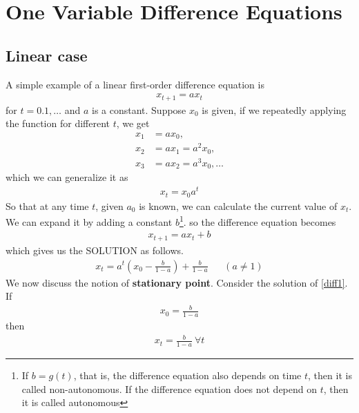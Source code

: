 \documentclass[11pt,a4paper]{book}
\theoremstyle{definition}\newtheorem{definition}{Definition}
\theoremstyle{definition}\newtheorem{fact}{Fact}
\theoremstyle{definition}\newtheorem{remark}{Remark}
\theoremstyle{definition}\newtheorem{ex}{Ex.}
\theoremstyle{definition}\newtheorem{project}{Project}
\theoremstyle{definition}\newtheorem{problem}{Problem}
\theoremstyle{definition}\newtheorem{example}{Example}
\numberwithin{theorem}{section}
\numberwithin{corollary}{chapter}
\numberwithin{assumption}{chapter}
\numberwithin{definition}{chapter}
\numberwithin{prop}{chapter}
\numberwithin{notation}{chapter}
\numberwithin{problem}{chapter}
\numberwithin{example}{chapter}
\numberwithin{fact}{chapter}
\numberwithin{ex}{chapter}
\begin{document}
	
	\section{One Variable Difference Equations}
	\subsection{Linear case}
	A simple example of a linear first-order difference equation is
	\begin{align*}
		x_{t+1} = a x_t
	\end{align*}
	for $t = 0.1,\dots$ and $a$ is a constant. Suppose $x_0$ is given, if we repeatedly applying the function for different $t$, we get
	\begin{align*}
		x_1 &= a x_0, \\
		x_2 &= a x_1 = a^2 x_0, \\
		x_3 &= a x_2 = a^3 x_0, \dots
	\end{align*}
	which we can generalize it as
	\begin{align*}
		x_t = x_0 a^t
	\end{align*}
	So that at any time $t$, given $a_0$ is known, we can calculate the current value of $x_t$. We can expand it by adding a constant $b$\footnote{If $b = g(t)$, that is, the difference equation also depends on time $t$, then it is called non-autonomous. If the difference equation does not depend on $t$, then it is called autonomous}. so the difference equation becomes
		\begin{align}
			x_{t+1} = a x_t + b \label{diff1}
	\end{align}
	which gives us the SOLUTION as follows.
	\begin{align*}
		x_t = a^t \left(x_0 - \frac{b}{1-a} \right) + \frac{b}{1-a} && (a \neq 1 )
	\end{align*}
	We now discuss the notion of \textbf{stationary point}. Consider the solution of \eqref{diff1}. If
	\begin{align*}
		x_0 = \frac{b}{1-a}
	\end{align*}
	then 
	\begin{align*}
		x_t = \frac{b}{1-a} \ \forall t
	\end{align*}
\end{document}
